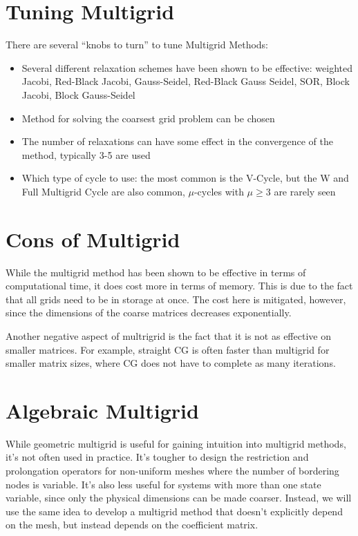 \documentclass[11pt]{article}
\begin{document}
    \hypertarget{tuning-multigrid}{%
\section{Tuning Multigrid}\label{tuning-multigrid}}

There are several ``knobs to turn'' to tune Multigrid Methods:
\begin{itemize}
\item Several different relaxation schemes have been shown to be effective: weighted
Jacobi, Red-Black Jacobi, Gauss-Seidel, Red-Black Gauss Seidel, SOR,
Block Jacobi, Block Gauss-Seidel 
\item Method for solving the coarsest grid problem can be chosen 
\item The number of relaxations can have some effect in the convergence of the
  method, typically 3-5 are used 
\item Which type of cycle to use: the most common is the V-Cycle, but the W and Full
Multigrid Cycle are also common, \(\mu\)-cycles with \(\mu \geq 3\) are
rarely seen
\end{itemize}

    \hypertarget{cons-of-multigrid}{%
\section{Cons of Multigrid}\label{cons-of-multigrid}}

While the multigrid method has been shown to be effective in terms of
computational time, it does cost more in terms of memory. This is due to
the fact that all grids need to be in storage at once. The cost here is
mitigated, however, since the dimensions of the coarse matrices decreases
exponentially.

Another negative aspect of multrigrid is the fact that it is not as
effective on smaller matrices. For example, straight CG is often faster
than multigrid for smaller matrix sizes, where CG does not have to
complete as many iterations.

    \hypertarget{algebraic-multigrid}{%
\section{Algebraic Multigrid}\label{algebraic-multigrid}}

While geometric multigrid is useful for gaining intuition into multigrid
methods, it's not often used in practice. It's tougher to design the
restriction and prolongation operators for non-uniform meshes where the
number of bordering nodes is variable. It's also less useful for systems
with more than one state variable, since only the physical dimensions
can be made coarser. Instead, we will use the same idea to develop a
multigrid method that doesn't explicitly depend on the mesh, but instead
depends on the coefficient matrix.
\end{document}

